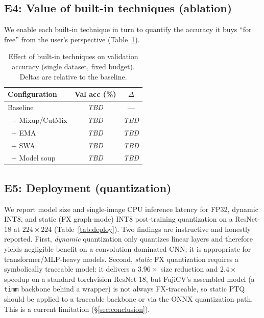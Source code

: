\documentclass[11pt]{article}
\begin{document}
\subsection{E4: Value of built-in techniques (ablation)}
\label{sec:e4}
We enable each built-in technique in turn to quantify the accuracy it buys
``for free'' from the user's perspective (Table~\ref{tab:ablation}).

\begin{table}[h]
\centering
\caption{Effect of built-in techniques on validation accuracy (single dataset,
fixed budget). Deltas are relative to the baseline.}
\label{tab:ablation}
\small
\begin{tabular}{lcc}
\toprule
Configuration & Val acc (\%) & $\Delta$ \\
\midrule
Baseline           & \textit{TBD} & --- \\
\ + Mixup/CutMix   & \textit{TBD} & \textit{TBD} \\
\ + EMA            & \textit{TBD} & \textit{TBD} \\
\ + SWA            & \textit{TBD} & \textit{TBD} \\
\ + Model soup     & \textit{TBD} & \textit{TBD} \\
\bottomrule
\end{tabular}
\end{table}

\subsection{E5: Deployment (quantization)}
\label{sec:e5}
We report model size and single-image CPU inference latency for FP32, dynamic
INT8, and static (FX graph-mode) INT8 post-training quantization on a ResNet-18
at $224{\times}224$ (Table~\ref{tab:deploy}). Two findings are instructive and
honestly reported. First, \emph{dynamic} quantization only quantizes linear
layers and therefore yields negligible benefit on a convolution-dominated CNN;
it is appropriate for transformer/MLP-heavy models. Second, \emph{static} FX
quantization requires a symbolically traceable model: it delivers a
$3.96\times$ size reduction and $2.4\times$ speedup on a standard torchvision
ResNet-18, but FujiCV's assembled model (a \texttt{timm} backbone behind a
wrapper) is not always FX-traceable, so static PTQ should be applied to a
traceable backbone or via the ONNX quantization path. This is a current
limitation (\S\ref{sec:conclusion}).
\end{document}
